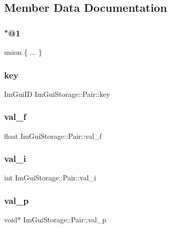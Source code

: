 \subsection{Member Data Documentation}
\hypertarget{struct_im_gui_storage_1_1_pair_a59f447bb1e6c85a5fe325b914b832173}{}\label{struct_im_gui_storage_1_1_pair_a59f447bb1e6c85a5fe325b914b832173} 
\subsubsection{\texorpdfstring{"@1}{@1}}
{\footnotesize\ttfamily union \{ ... \} }

\hypertarget{struct_im_gui_storage_1_1_pair_a5b37b692d2eacc7f4f5b6f233359e6ce}{}\label{struct_im_gui_storage_1_1_pair_a5b37b692d2eacc7f4f5b6f233359e6ce} 
\subsubsection{\texorpdfstring{key}{key}}
{\footnotesize\ttfamily Im\+Gui\+ID Im\+Gui\+Storage\+::\+Pair\+::key}

\hypertarget{struct_im_gui_storage_1_1_pair_adf93d369480896f4d4b6dbf707de7bc8}{}\label{struct_im_gui_storage_1_1_pair_adf93d369480896f4d4b6dbf707de7bc8} 
\subsubsection{\texorpdfstring{val\+\_\+f}{val\_f}}
{\footnotesize\ttfamily float Im\+Gui\+Storage\+::\+Pair\+::val\+\_\+f}

\hypertarget{struct_im_gui_storage_1_1_pair_ad6d89ae042ab3e6db8b1e1cf47b05c5e}{}\label{struct_im_gui_storage_1_1_pair_ad6d89ae042ab3e6db8b1e1cf47b05c5e} 
\subsubsection{\texorpdfstring{val\+\_\+i}{val\_i}}
{\footnotesize\ttfamily int Im\+Gui\+Storage\+::\+Pair\+::val\+\_\+i}

\hypertarget{struct_im_gui_storage_1_1_pair_ac678b2f593c5de682b84ef41e9f30b06}{}\label{struct_im_gui_storage_1_1_pair_ac678b2f593c5de682b84ef41e9f30b06} 
\subsubsection{\texorpdfstring{val\+\_\+p}{val\_p}}
{\footnotesize\ttfamily void$\ast$ Im\+Gui\+Storage\+::\+Pair\+::val\+\_\+p}

